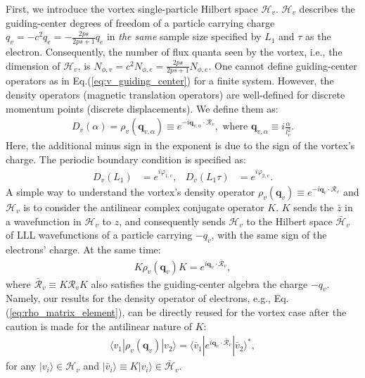 First, we introduce the vortex single-particle Hilbert space $\mathcal H_v$. $\mathcal H_v$ describes the guiding-center degrees of freedom of a particle carrying charge $q_v=-c^2q_e=-\frac{2ps}{2ps+1}q_e$ in \emph{the same} sample size specified by $L_1$ and $\tau$ as the electron. Consequently, the number of flux quanta seen by the vortex, i.e., the dimension of $\mathcal H_v$, is $N_{\phi,v}=c^2 N_{\phi,e}=\frac{2ps}{2ps+1}N_{\phi,e}$. One cannot define guiding-center operators as in Eq.(\ref{eq:v_guiding_center}) for a finite system. However, the density operators (magnetic translation operators) are well-defined for discrete momentum points (discrete displacements). We define them as:
\begin{align}
D_v(\alpha)=\rho_v(\mathbf q_{v,\alpha}) \equiv e^{-i\mathbf q_{v,\alpha}\cdot \mathcal R_v},\text{ where }\mathbf q_{v,\alpha}\equiv i\frac{\alpha}{l_v^2}.\label{eq:D_v}
\end{align}
Here, the additional minus sign in the exponent is due to the sign of the vortex's charge. The periodic boundary condition is specified as:
\begin{align}
D_v(L_1)&=e^{i\varphi_{1,v}},&D_v(L_1\tau)&=e^{i\varphi_{2,v}}.
\end{align}
A simple way to understand the vortex's density operator $\rho_v(\mathbf q_v)\equiv e^{-i\mathbf q_{v}\cdot \mathcal R_v}$ and $\mathcal H_v$ is to consider the antilinear complex conjugate operator $K$. $K$ sends the $\bar z$ in a wavefunction in $\mathcal H_v$ to $z$, and consequently sends $\mathcal H_v$ to the Hilbert space $\bar{\mathcal H}_v$ of LLL wavefunctions of a particle carrying $-q_v$, with the same sign of the electrons' charge. At the same time:
\begin{align}
K \rho_v(\mathbf q_v) K=e^{i\mathbf q_v\cdot \bar{\mathcal R}_v},
\end{align}
where $\bar{\mathcal R}_v\equiv K\mathcal R_v K$ also satisfies the guiding-center algebra the charge $-q_v$. Namely, our results for the density operator of electrons, e.g., Eq.(\ref{eq:rho_matrix_element}), can be directly reused for the vortex case after the caution is made for the antilinear nature of $K$:
\begin{align}
\langle v_1|\rho_v(\mathbf q_v)|v_2\rangle=\langle \bar{v}_1|e^{i\mathbf q_v\cdot \bar{\mathcal R}_v}|\bar{v}_2 \rangle^*,
\end{align}
for any $|v_i\rangle\in\mathcal H_v$ and $|\bar{v}_i \rangle\equiv K|v_i\rangle\in \bar{\mathcal H}_v$.

